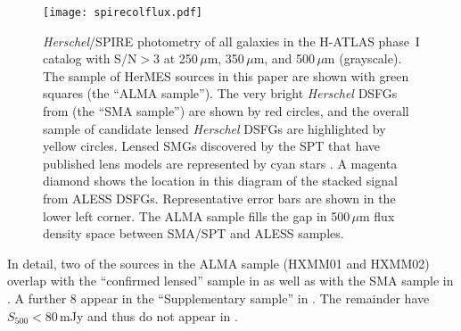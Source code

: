 \documentclass[iop]{emulateapj}
\begin{document}
\begin{figure}[!tbp] 
\texttt{[image: spirecolflux.pdf]}

\caption{ {\it Herschel}/SPIRE photometry of all galaxies in the H-ATLAS
phase~I catalog with S/N$ > 3$ at 250$\,\mu$m, 350$\,\mu$m, and 500$\,\mu$m
(grayscale).  The sample of HerMES sources in this paper are shown with green
squares (the ``ALMA sample'').  The very bright {\it Herschel} DSFGs from
\citet{Bussmann:2013lr} (the ``SMA sample'') are shown by red circles, and the
overall sample of candidate lensed {\it Herschel} DSFGs are highlighted by
yellow circles.  Lensed SMGs discovered by the SPT that have published lens
models are represented by cyan stars \citep{Hezaveh:2013fk}.  A magenta diamond
shows the location in this diagram of the stacked signal from ALESS DSFGs.
Representative error bars are shown in the lower left corner.  The ALMA sample
fills the gap in 500$\,\mu$m flux density space between SMA/SPT and ALESS
samples.} \label{fig:sample}

\end{figure}

In detail, two of the sources in the ALMA sample (HXMM01 and HXMM02) overlap
with the ``confirmed lensed'' sample in \citet{Wardlow:2013lr} as well as with
the SMA sample in \citet{Bussmann:2013lr}.  A further 8 appear in the
``Supplementary sample'' in \citet{Wardlow:2013lr}.  The remainder have
$S_{500} < 80\,$mJy and thus do not appear in \citet{Wardlow:2013lr}.

\end{document}
